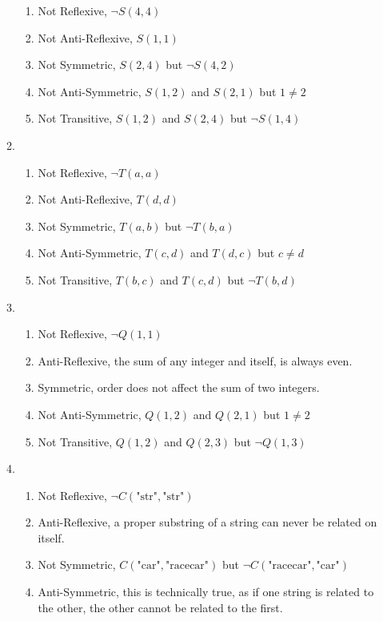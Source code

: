 \documentclass{article}
\begin{document}
\begin{enumerate}
\begin{enumerate}
\begin{enumerate}
            \item Not Reflexive, $\neg S(4, 4)$
            \item Not Anti-Reflexive, $S(1, 1)$
            \item Not Symmetric, $S(2,4)$ but $\neg S(4,2)$
            \item Not Anti-Symmetric, $S(1,2)$ and $S(2,1)$ but $1 \neq 2$
            \item Not Transitive, $S(1,2)$ and $S(2,4)$ but $\neg S(1,4)$
        \end{enumerate}
        \item
        \begin{enumerate}
            \item Not Reflexive, $\neg T(a,a)$
            \item Not Anti-Reflexive, $T(d,d)$
            \item Not Symmetric, $T(a,b)$ but $\neg T(b,a)$
            \item Not Anti-Symmetric, $T(c,d)$ and $T(d,c)$ but $c \neq d$
            \item Not Transitive, $T(b,c)$ and $T(c,d)$ but $\neg T(b,d)$
        \end{enumerate}
        \item
        \begin{enumerate}
            \item Not Reflexive, $\neg Q(1,1)$
            \item Anti-Reflexive, the sum of any integer and itself, is always even.
            \item Symmetric, order does not affect the sum of two integers.
            \item Not Anti-Symmetric, $Q(1,2)$ and $Q(2,1)$ but $1 \neq 2$
            \item Not Transitive, $Q(1,2)$ and $Q(2,3)$ but $\neg Q(1,3)$
        \end{enumerate}
        \item
        \begin{enumerate}
            \item Not Reflexive, $\neg C(\text{"str"}, \text{"str"})$
            \item Anti-Reflexive, a proper substring of a string can never be related on itself.
            \item Not Symmetric, $C(\text{"car"}, \text{"racecar"})$ but $\neg C(\text{"racecar"}, \text{"car"})$
            \item Anti-Symmetric, this is technically true, as if one string is related to the other, the other cannot be related to the first.

\end{enumerate}
\end{enumerate}
\end{enumerate}
\end{document}

